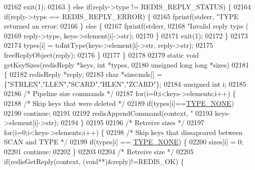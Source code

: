 \begin{DoxyCode}
{{{{{{{{{{{{{{{{{{{{{{{{{{{{{{{{{{{{{{{{{{{{{{{{{{{{{{{{{{{{{{{{02162             exit(1);
02163         \} \textcolor{keywordflow}{else} \textcolor{keywordflow}{if}(reply->type != REDIS\_REPLY\_STATUS) \{
02164             \textcolor{keywordflow}{if}(reply->type == REDIS\_REPLY\_ERROR) \{
02165                 fprintf(stderr, \textcolor{stringliteral}{"TYPE returned an error: %
02166             \} \textcolor{keywordflow}{else} \{
02167                 fprintf(stderr,
02168                     \textcolor{stringliteral}{"Invalid reply type (%
02169                     reply->type, keys->element[i]->str);
02170             \}
02171             exit(1);
02172         \}
02173 
02174         types[i] = toIntType(keys->element[i]->str, reply->str);
02175         freeReplyObject(reply);
02176     \}
02177 \}
02178 
02179 \textcolor{keyword}{static} \textcolor{keywordtype}{void} getKeySizes(redisReply *keys, \textcolor{keywordtype}{int} *types,
02180                         \textcolor{keywordtype}{unsigned} \textcolor{keywordtype}{long} \textcolor{keywordtype}{long} *sizes)
02181 \{
02182     redisReply *reply;
02183     \textcolor{keywordtype}{char} *sizecmds[] = \{\textcolor{stringliteral}{"STRLEN"},\textcolor{stringliteral}{"LLEN"},\textcolor{stringliteral}{"SCARD"},\textcolor{stringliteral}{"HLEN"},\textcolor{stringliteral}{"ZCARD"}\};
02184     \textcolor{keywordtype}{unsigned} \textcolor{keywordtype}{int} i;
02185 
02186     \textcolor{comment}{/* Pipeline size commands */}
02187     \textcolor{keywordflow}{for}(i=0;i<keys->elements;i++) \{
02188         \textcolor{comment}{/* Skip keys that were deleted */}
02189         \textcolor{keywordflow}{if}(types[i]==\hyperlink{redis-cli_8c_aa47d3c2fa05e95455d76cf052f9cca68}{TYPE\_NONE})
02190             \textcolor{keywordflow}{continue};
02191 
02192         redisAppendCommand(context, \textcolor{stringliteral}{"%
02193             keys->element[i]->str);
02194     \}
02195 
02196     \textcolor{comment}{/* Retreive sizes */}
02197     \textcolor{keywordflow}{for}(i=0;i<keys->elements;i++) \{
02198         \textcolor{comment}{/* Skip keys that dissapeared between SCAN and TYPE */}
02199         \textcolor{keywordflow}{if}(types[i] == \hyperlink{redis-cli_8c_aa47d3c2fa05e95455d76cf052f9cca68}{TYPE\_NONE}) \{
02200             sizes[i] = 0;
02201             \textcolor{keywordflow}{continue};
02202         \}
02203 
02204         \textcolor{comment}{/* Retreive size */}
02205         \textcolor{keywordflow}{if}(redisGetReply(context, (\textcolor{keywordtype}{void}**)&reply)!=REDIS\_OK) \{
}}}}}}}}}}}}}}}}}}}}}}}}}}}}}}}}}}}}}}}}}}}}}}}}}}}}}}}}}}}}}}}}}}}
\end{DoxyCode}
